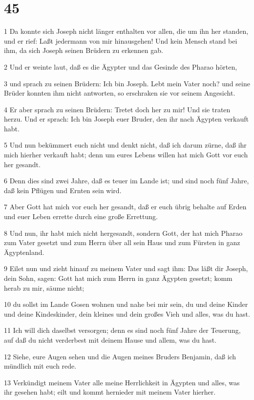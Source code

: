 \chapter{45}

\par 1 Da konnte sich Joseph nicht länger enthalten vor allen, die um ihn her standen, und er rief: Laßt jedermann von mir hinausgehen! Und kein Mensch stand bei ihm, da sich Joseph seinen Brüdern zu erkennen gab.
\par 2 Und er weinte laut, daß es die Ägypter und das Gesinde des Pharao hörten,
\par 3 und sprach zu seinen Brüdern: Ich bin Joseph. Lebt mein Vater noch? und seine Brüder konnten ihm nicht antworten, so erschraken sie vor seinem Angesicht.
\par 4 Er aber sprach zu seinen Brüdern: Tretet doch her zu mir! Und sie traten herzu. Und er sprach: Ich bin Joseph euer Bruder, den ihr nach Ägypten verkauft habt.
\par 5 Und nun bekümmert euch nicht und denkt nicht, daß ich darum zürne, daß ihr mich hierher verkauft habt; denn um eures Lebens willen hat mich Gott vor euch her gesandt.
\par 6 Denn dies sind zwei Jahre, daß es teuer im Lande ist; und sind noch fünf Jahre, daß kein Pflügen und Ernten sein wird.
\par 7 Aber Gott hat mich vor euch her gesandt, daß er euch übrig behalte auf Erden und euer Leben errette durch eine große Errettung.
\par 8 Und nun, ihr habt mich nicht hergesandt, sondern Gott, der hat mich Pharao zum Vater gesetzt und zum Herrn über all sein Haus und zum Fürsten in ganz Ägyptenland.
\par 9 Eilet nun und zieht hinauf zu meinem Vater und sagt ihm: Das läßt dir Joseph, dein Sohn, sagen: Gott hat mich zum Herrn in ganz Ägypten gesetzt; komm herab zu mir, säume nicht;
\par 10 du sollst im Lande Gosen wohnen und nahe bei mir sein, du und deine Kinder und deine Kindeskinder, dein kleines und dein großes Vieh und alles, was du hast.
\par 11 Ich will dich daselbst versorgen; denn es sind noch fünf Jahre der Teuerung, auf daß du nicht verderbest mit deinem Hause und allem, was du hast.
\par 12 Siehe, eure Augen sehen und die Augen meines Bruders Benjamin, daß ich mündlich mit euch rede.
\par 13 Verkündigt meinem Vater alle meine Herrlichkeit in Ägypten und alles, was ihr gesehen habt; eilt und kommt hernieder mit meinem Vater hierher.
